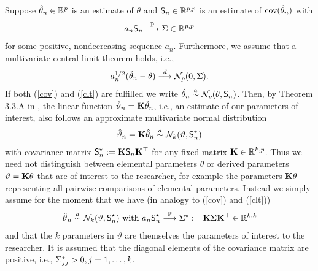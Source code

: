 \documentclass[12pt,a4paper]{article}
\begin{document}
Suppose $\hat{\theta}_n \in \mathbb{R}^p$ is an estimate of $\theta$ and
$\textsf{S}_n \in \mathbb{R}^{p,p}$ is an estimate of $\text{cov}(\hat{\theta}_n)$ with
\begin{eqnarray} \label{cov}
a_n \textsf{S}_n \stackrel{\mathbb{P}}{\longrightarrow} \Sigma \in \mathbb{R}^{p,p}
\end{eqnarray}
for some positive, nondecreasing sequence $a_n$.
Furthermore, we assume that a multivariate central limit theorem holds,
i.e.,
\begin{eqnarray} \label{clt}
a_n^{1/2} (\hat{\theta}_n - \theta) \stackrel{d}{\longrightarrow} \mathcal{N}_p(0, \Sigma).
\end{eqnarray}
If both (\ref{cov}) and (\ref{clt}) are fulfilled we write $\hat{\theta}_n \stackrel{a}{\sim}
\mathcal{N}_p(\theta, \textsf{S}_n)$. Then, by Theorem 3.3.A in
\cite{Serfling1980}, the linear function $\hat{\vartheta}_n = \mathbf{K}
\hat{\theta}_n$, i.e., an estimate of our parameters of interest, 
also follows an approximate multivariate normal 
distribution
\begin{eqnarray*}
\hat{\vartheta}_n = \mathbf{K} \hat{\theta}_n \stackrel{a}{\sim} \mathcal{N}_k(\vartheta, \textsf{S}^\star_n)
\end{eqnarray*}
with covariance matrix $\textsf{S}^\star_n := \mathbf{K} \textsf{S}_n \mathbf{K}^\top$
for any fixed matrix $\mathbf{K} \in \mathbb{R}^{k,p}$. Thus we need not distinguish
between elemental parameters $\theta$ or derived parameters $\vartheta = \mathbf{K} \theta$ 
that are of interest to the researcher, for example the parameters $\mathbf{K} \theta$ representing
all pairwise comparisons of elemental parameters. Instead we simply assume 
for the moment that we have (in analogy to (\ref{cov}) and (\ref{clt}))
\begin{eqnarray} \label{assume}
\hat{\vartheta}_n \stackrel{a}{\sim} \mathcal{N}_k(\vartheta, \textsf{S}^\star_n) \text{ with } 
a_n \textsf{S}^\star_n \stackrel{\mathbb{P}}{\longrightarrow} \Sigma^\star := \mathbf{K} \Sigma \mathbf{K}^\top \in \mathbb{R}^{k,k}
\end{eqnarray}
and that the $k$ parameters in $\vartheta$ are themselves the 
parameters of interest to the researcher. It is assumed that
the diagonal elements of the covariance matrix are positive, i.e., 
$\Sigma^\star_{jj} > 0, j = 1, \dots, k$.
\end{document}
